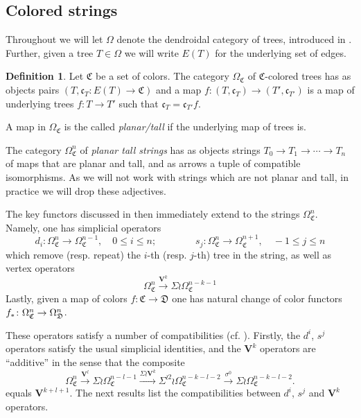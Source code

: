 \documentclass[a4paper,10pt
,draft
]{article}%
\numberwithin{equation}{section}
\numberwithin{figure}{section}
\theoremstyle{definition} %
\newtheorem{definition}[equation]{Definition}%
\newcommand{\1}{\ensuremath{\mathbbm 1}}%
\begin{document}



\subsection{Colored strings}
\label{CSTRINGS_SEC}


Throughout we will let $\Omega$ denote the dendroidal category of trees, introduced in \cite{MW07}.
Further, given a tree $T\in \Omega$ we will write 
$E(T)$ for the underlying set of edges.

\begin{definition}
Let $\mathfrak{C}$ be a set of colors.
The category $\Omega_{\mathfrak{C}}$ of $\mathfrak{C}$-colored trees has as objects pairs
$(T,\mathfrak{c}_T\colon E(T) \to \mathfrak{C})$ and a map
$f\colon (T,\mathfrak{c}_T) \to (T',\mathfrak{c}_{T'})$
is a map of underlying trees $f\colon T \to T'$
such that $\mathfrak{c}_T = \mathfrak{c}_{T'} f$.

A map in $\Omega_{\mathfrak{C}}$ is the called \textit{planar/tall} if the underlying map of trees is.

The category $\Omega_{\mathfrak{C}}^n$ of \textit{planar tall strings} has as objects strings $T_0 \to T_1 \to \cdots \to T_n$ of maps that are planar and tall, and as arrows a tuple of compatible isomorphisms.
As we will not work with strings which are not planar and tall, in practice we will drop these adjectives.
\end{definition}


The key functors discussed in \cite[\S 3.4]{BP_geo} then immediately extend to the strings
$\Omega_{\mathfrak{C}}^n$. Namely, one has simplicial operators
\[
d_i \colon \Omega_{\mathfrak{C}}^n \to \Omega_{\mathfrak{C}}^{n-1},
\quad 0 \leq i \leq n;
\qquad \qquad
s_j \colon \Omega_{\mathfrak{C}}^{n} \to \Omega_{\mathfrak{C}}^{n+1},
\quad -1 \leq j \leq n
\]
which remove (resp. repeat) the $i$-th (resp. $j$-th) tree in the string,
as well as vertex operators
\[
\Omega^{n}_{\mathfrak{C}}
\xrightarrow{\boldsymbol{V}^k}
\Sigma \wr \Omega^{n-k-1}_{\mathfrak{C}}
\]
Lastly, given a map of colors 
$f \colon \mathfrak{C} \to \mathfrak{D}$
one has natural change of color functors
$f_{\**} \colon \Omega^n_{\mathfrak{C}} \to \Omega^n_{\mathfrak{D}}$.



These operators satisfy a number of compatibilities (cf. \cite[Prop. 3.90]{BP_geo}). Firstly, the $d^i$, $s^j$ operators satisfy the usual simplicial identities, 
and the $\boldsymbol{V}^k$ operators are ``additive'' in the sense that
the composite
\begin{equation}\label{VKADD EQ}
	\Omega^{n}_{\mathfrak{C}} \xrightarrow{\boldsymbol{V}^l} 
	\Sigma \wr \Omega^{n-l-1}_{\mathfrak{C}} \xrightarrow{\Sigma \wr \boldsymbol{V}^k}
	\Sigma^{\wr 2} \wr \Omega^{n-k-l-2}_{\mathfrak{C}} \xrightarrow{\sigma^0}
	\Sigma \wr \Omega^{n-k-l-2}_{\mathfrak{C}}.
\end{equation}
equals $\boldsymbol{V}^{k+l+1}$.
The next results list the compatibilities between $d^i$, $s^j$ and $\boldsymbol{V}^k$ operators.
\end{document}
